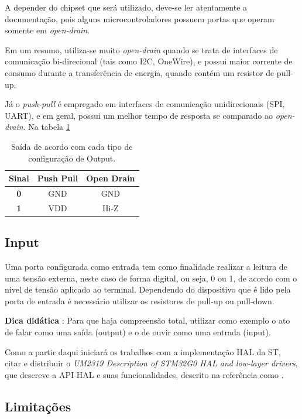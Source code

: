 \documentclass[12pt,a4paper]{report}
\begin{document}
A depender do chipset que será utilizado, deve-se ler atentamente a documentação, pois alguns microcontroladores possuem portas que operam somente em \textit{open-drain}.

Em um resumo, utiliza-se muito \textit{open-drain} quando se trata de interfaces de comunicação bi-direcional (tais como I2C, OneWire), e possui maior corrente de consumo durante a transferência de energia, quando contém um resistor de pull-up.

Já o \textit{push-pull} é empregado em interfaces de comunicação unidirecionais (SPI, UART), e em geral, possui um melhor tempo de resposta se comparado ao \textit{open-drain}. Na tabela \ref{table:pp_od_signal} 

\begin{table}[H]
    \centering
    \caption{Saída de acordo com cada tipo de configuração de Output.}
    \begin{tabular}{c|c|c}
    \textbf{Sinal} & \textbf{Push Pull} & \textbf{Open Drain} \\ \hline 
    \textbf{0}     & GND                & GND                 \\ 
    \textbf{1}     & VDD                & Hi-Z               
    \end{tabular}
    \label{table:pp_od_signal}
\end{table}

\subsection{Input}

Uma porta configurada como entrada tem como finalidade realizar a leitura de uma tensão externa, neste caso de forma digital, ou seja, 0 ou 1, de acordo com o nível de tensão aplicado ao terminal. Dependendo do dispositivo que é lido pela porta de entrada é necessário utilizar os resistores de pull-up ou pull-down.

\textbf{Dica didática} : Para que haja compreensão total, utilizar como exemplo o ato de falar como uma saída (output) e o de ouvir como uma entrada (input).

Como a partir daqui iniciará os trabalhos com a implementação HAL da ST, citar e distribuir o \textit{UM2319 Description of STM32G0 HAL and low-layer drivers}, que descreve a API HAL e suas funcionalidades, descrito na referência como \cite{ci:um2319}.

\subsection{Limitações}
\end{document}

